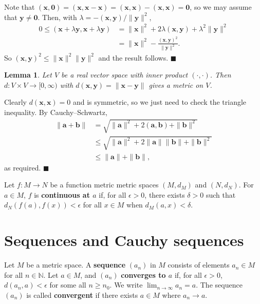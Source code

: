 \documentclass[letter-paper]{tufte-book}
\newtheorem{lemma}[theorem]{\color{pastel-blue}Lemma}
\newenvironment{proof}[1][Proof]{\begin{trivlist}
\item[\hskip \labelsep {\bfseries #1}]}{\end{trivlist}}
\newcommand{\ab}{\boldsymbol{a}}
\newcommand{\bb}{\boldsymbol{b}}
\newcommand{\xb}{\boldsymbol{x}}
\newcommand{\yb}{\boldsymbol{y}}
\newcommand{\qed}{\hfill$\blacksquare$}
\begin{document}
\begin{proof}
  Note that $(\xb, \boldsymbol{0}) = (\xb, \xb - \xb) = (\xb, \xb) - (\xb, \xb)
  = \boldsymbol{0}$, so we may assume that $\yb \neq \boldsymbol{0}$. Then, with
  $\lambda = -(\xb, \yb) / \|\yb\|^2$,
  \begin{align*}
    0 \leq (\xb + \lambda \yb, \xb + \lambda \yb) 
      & = \| \xb \|^2 + 2\lambda(\xb, \yb) + \lambda^2 \| \yb \|^2\\
      & = \| \xb \|^2 - \frac{(\xb, \yb)^2}{\| \yb \|^2}.
  \end{align*}
  So $(\xb, \yb)^2 \leq \| \xb \|^2 \| \yb \|^2$ and the result follows. \qed
\end{proof}

\begin{lemma}
  Let $V$ be a real vector space with inner product $(\cdot, \cdot)$. Then $d: V
  \times V \to [0, \infty)$ with $d(\xb, \yb) = \| \xb - \yb\|$ gives a metric
  on $V$.
\end{lemma}

\begin{proof}
  Clearly $d(\xb, \xb) = 0$ and is symmetric, so we just need to check the
  triangle inequality. By Cauchy--Schwartz,
  \begin{align*}
    \| \ab + \bb\| &= \sqrt{\|\ab\|^2 + 2(\ab, \bb) + \| \bb\|^2} \\
      &\leq \sqrt{\|\ab\|^2 + 2\|\ab\| \|\bb\| + \| \bb\|^2} \\
      &\leq \|\ab\| + \|\bb\|,
  \end{align*}
  as required. \qed
\end{proof}

Let $f: M \to N$ be a function metric metric spaces $(M, d_M)$ and $(N, d_N)$.
For $a \in M$, $f$ is \textbf{continuous at $a$} if, for all $\epsilon > 0$,
there exists $\delta >0$ such that $d_N(f(a), f(x)) < \epsilon$ for all $x\in M$
when $d_M(a, x) < \delta$.


\section{Sequences and Cauchy sequences}

Let $M$ be a metric space. A \textbf{sequence} $(a_n)$ in $M$ consists of
elements $a_n \in M$ for all $n\in\mathbb{N}$. Let $a \in M$, and $(a_n)$
\textbf{converges to $a$} if, for all $\epsilon > 0$, $d(a_n, a) < \epsilon$
for some all $n \geq n_0$. We write $\lim_{n\to\infty} a_n = a$. The sequence
$(a_n)$ is called \textbf{convergent} if there exists $a\in M$ where $a_n \to
a$.
\end{document}
